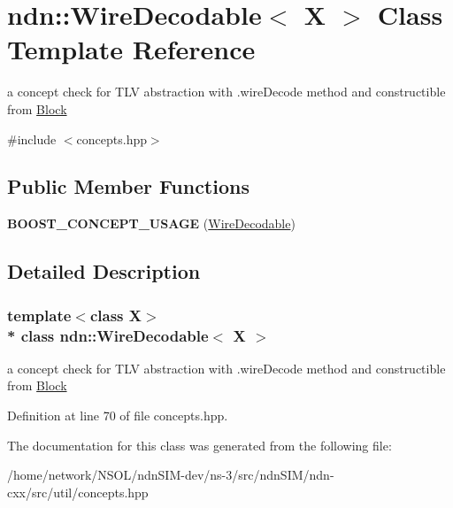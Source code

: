 \hypertarget{classndn_1_1WireDecodable}{}\section{ndn\+:\+:Wire\+Decodable$<$ X $>$ Class Template Reference}
\label{classndn_1_1WireDecodable}


a concept check for T\+LV abstraction with .wire\+Decode method and constructible from \hyperlink{classndn_1_1Block}{Block}  




{\ttfamily \#include $<$concepts.\+hpp$>$}

\subsection*{Public Member Functions}
\begin{DoxyCompactItemize}
\item 
{\bfseries B\+O\+O\+S\+T\+\_\+\+C\+O\+N\+C\+E\+P\+T\+\_\+\+U\+S\+A\+GE} (\hyperlink{classndn_1_1WireDecodable}{Wire\+Decodable})\hypertarget{classndn_1_1WireDecodable_ab1b3e01b269b47e3e4477942d50ae0ef}{}\label{classndn_1_1WireDecodable_ab1b3e01b269b47e3e4477942d50ae0ef}

\end{DoxyCompactItemize}


\subsection{Detailed Description}
\subsubsection*{template$<$class X$>$\\*
class ndn\+::\+Wire\+Decodable$<$ X $>$}

a concept check for T\+LV abstraction with .wire\+Decode method and constructible from \hyperlink{classndn_1_1Block}{Block} 

Definition at line 70 of file concepts.\+hpp.



The documentation for this class was generated from the following file\+:\begin{DoxyCompactItemize}
\item 
/home/network/\+N\+S\+O\+L/ndn\+S\+I\+M-\/dev/ns-\/3/src/ndn\+S\+I\+M/ndn-\/cxx/src/util/concepts.\+hpp\end{DoxyCompactItemize}

